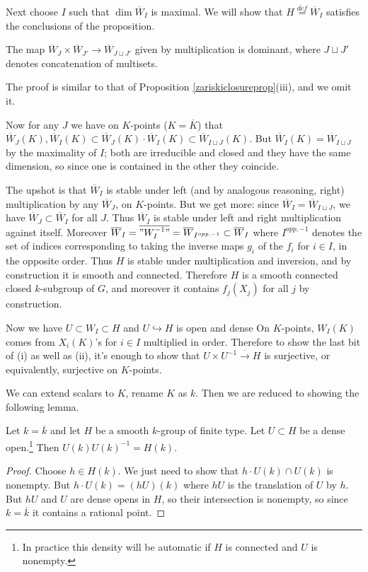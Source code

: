 \documentclass[10pt]{article}
\renewcommand{\(}{\left(}
\renewcommand{\)}{\right)}
\renewcommand{\bar}{\overline}
\newcommand{\into}{\hookrightarrow}
\numberwithin{thm}{subsection}
\begin{document}
Next choose $I$ such that $\dim \bar W_I$ is maximal.
We will show that $H\stackrel{def}{=}\bar W_I$  satisfies the conclusions of the proposition.

\begin{claim}
The map $\bar W_J\times \bar W_{J'}\to \bar W_{J\sqcup J'}$ 
given by multiplication is dominant,
where $J\sqcup J'$ denotes concatenation of multisets.
\end{claim}
The proof is similar to that of Proposition \ref{zariskiclosureprop}(iii),
and we omit it.

Now for any $J$ we have on $K$-points ($K=\bar K$)
that $\bar W_J(K),\bar W_I(K)\subset \bar W_J(K)\cdot \bar W_I(K)\subset \bar W_{I\sqcup J}(K)$.
But $\bar W_I(K)=\bar W_{I\sqcup J}$ by the maximality of $I$;
both are irreducible and closed and they have the same dimension,
so since one is contained in the other they coincide.

The upshot is that $\bar W_I$ is stable under left (and by analogous reasoning, right) multiplication by any $\bar W_J$, on $K$-points.
But we get more: since $\bar W_I=\bar W_{I\sqcup J}$,
we have $\bar W_J\subset \bar W_I$ for all $J$.
Thus $\bar W_I$ is stable under left and right multiplication against itself.
Moreover $\bar W_I=\bar{"W_I^{-1}"}=\bar W_{I^{opp,-1}}\subset \bar W_I$
where $I^{opp,-1}$ denotes the set of indices corresponding to taking the inverse maps $g_i$ of the $f_i$ for $i\in I$, in the opposite order.
Thus $H$ is stable under multiplication and inversion, 
and by construction it is smooth and connected.
Therefore $H$ is a smooth connected closed $k$-subgroup of $G$,
and moreover it contains $f_j(X_j)$ for all $j$ by construction.

Now we have $U\subset W_I\subset H$
and $U\into H$ is open and dense
On $K$-points, $W_I(K)$ comes from $X_i(K)$'s for $i\in I$
multiplied in order.
Therefore to show the last bit of (i)
as well as (ii),
it's enough to show that $U\times U^{-1}\stackrel{\cdot}{\to} H$ is surjective,
or equivalently, surjective on $K$-points.

We can extend scalars to $K$, rename $K$ as $k$.
Then we are reduced to showing the following lemma.
\begin{lem}
Let $k=\bar k$ and let $H$ be a smooth $k$-group of finite type.
Let $U\subset H$ be a dense open.\footnote{In practice this density will be automatic if $H$ is connected and $U$ is nonempty.}
Then $U(k)U(k)^{-1}=H(k)$.
\end{lem}
\begin{proof}
Choose $h\in H(k)$.
We just need to show that $h\cdot U(k)\cap U(k)$ is nonempty.
But $h\cdot U(k)=(hU)(k)$
where $hU$ is the translation of $U$ by $h$.
But $hU$ and $U$ are dense opens in $H$,
so their intersection is nonempty,
so since $k=\bar k$ it contains a rational point.
\end{proof}
\end{document}
